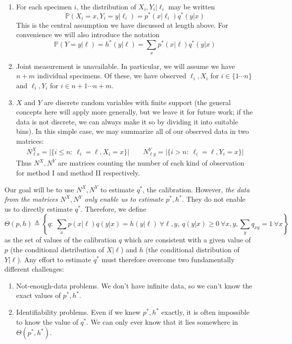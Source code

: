 \begin{enumerate}
\item For each specimen $i$, the distribution of $X_i,Y_i|\ell_i$ may be written 
\[
\mathbb{P}(X_i=x,Y_i=y|\ell_i) = p^*(x|\ell_i)q^*(y|x)
\]
This is the central assumption we have discussed at length above.  For convenience we will also introduce the notation
\[
\mathbb{P}(Y=y|\ell) = h^*(y|\ell)=\sum_x p^*(x|\ell) q^*(y|x)
\]
\item Joint measurement is unavailable.  In particular, we will assume we have $n+m$ individual specimens.  Of these, we have observed $\ell_i,X_i$ for $i\in\{1\cdots n\}$ and $\ell_i,Y_i$ for $i\in n+1\cdots n+m$.  
\item $X$ and $Y$ are discrete random variables with finite support (the general concepts here will apply more generally, but we leave it for future work; if the data is not discrete, we can always make it so by dividing it into suitable bins).  In this simple case, we may summarize all of our observed data in two matrices:
\begin{align}
N^X_{\ell x} = |\{i\leq n:\ \ell_i=\ell,X_i=x\}|  \qquad N^Y_{\ell y} = |\{i>n:\ \ell_i=\ell,Y_i=x\}|
\label{eq:twomatrices}
\end{align}
Thus $N^X,N^Y$ are matrices counting the number of each kind of observation for method I and method II respectively. 
\end{enumerate}

Our goal will be to use $N^X,N^Y$ to estimate $q^*$, the calibration.  However, \emph{the data from the matrices $N^X,N^Y$ only enable us to estimate $p^*,h^*$}.  They do not enable us to directly estimate $q^*$.  Therefore, we define
\[
\Theta(p,h) \triangleq  \left\{q:\ \sum_x p(x|\ell)q(y|x) = h(y|\ell)\ \forall \ell,y,\ q(y|x)\geq 0\ \forall x,y, \sum_y q_{xy}=1\ \forall x\right\}
\]
as the set of values of the calibration $q$ which are consistent with a given value of $p$ (the conditional distribution of $X|\ell$) and $h$ (the conditional distribution of $Y|\ell$).  Any effort to estimate $q^*$ must therefore overcome two fundamentally different challenges:

\begin{enumerate}
\item Not-enough-data problems. We don't have infinite data, so we can't know the exact values of $p^*,h^*$.
\item Identifiability problems. Even if we knew $p^*,h^*$ exactly, it is often impossible to know the value of $q^*$.  We can only ever know that it lies somewhere in $\Theta(p^*,h^*)$.  
\end{enumerate}

